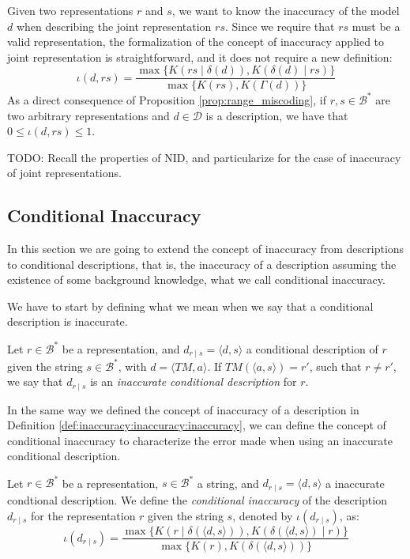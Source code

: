 Given two representations $r$ and $s$, we want to know the inaccuracy of the model $d$ when describing the joint representation $rs$. Since we require that $rs$ must be a valid representation, the formalization of the concept of inaccuracy applied to joint representation is straightforward, and it does not require a new definition:
\[
\iota(d, rs) = \frac{ \max\{ K \left(rs \mid \delta(d) \right), K \left( \delta(d) \mid rs \right) \} } { \max\{ K(rs), K \left(\Gamma(d) \right) \} }
\]
As a direct consequence of Proposition \ref{prop:range_miscoding}, if $r, s \in \mathcal{B}^\ast$ are two arbitrary representations and $d \in \mathcal{D}$ is a description, we have that $0 \leq \iota(d, rs) \leq 1$.

{\color{red} TODO: Recall the properties of NID, and particularize for the case of inaccuracy of joint representations.}

%
%

\subsection{Conditional Inaccuracy}

In this section we are going to extend the concept of inaccuracy from descriptions to conditional descriptions, that is, the inaccuracy of a description assuming the existence of some background knowledge, what we call conditional inaccuracy.

We have to start by defining what we mean when we say that a conditional description is inaccurate.

\begin{definition}
Let $r \in \mathcal{B}^\ast$ be a representation, and $d_{r \mid s} = \langle d, s \rangle$ a conditional description of $r$ given the string $s \in \mathcal{B}^\ast$, with $ d = \langle TM, a \rangle$. If $TM \left(\langle a, s \rangle \right) = r'$, such that $r \neq r'$, we say that $d_{r \mid s}$ is an \emph{inaccurate conditional description} for $r$.
\end{definition}

In the same way we defined the concept of inaccuracy of a description in Definition \ref{def:inaccuracy:inaccuracy:inaccuracy}, we can define the concept of conditional inaccuracy to characterize the error made when using an inaccurate conditional description.

\begin{definition}
Let $r \in \mathcal{B}^\ast$ be a representation, $s \in \mathcal{B}^\ast$ a string, and $d_{r \mid s} = \langle d, s \rangle$ a inaccurate condtional description. We define the \emph{conditional inaccuracy} of the description $d_{r \mid s}$ for the representation $r$ given the string $s$, denoted by $\iota(d_{r \mid s})$, as:
\[
\iota(d_{r \mid s}) = \frac{ \max\{ K \left(r \mid \delta(\langle d, s \rangle) \right), K \left( \delta(\langle d, s \rangle) \mid r \right) \} } { \max\{ K(r), K \left(\delta(\langle d, s \rangle) \right) \} }
\]
\end{definition}

